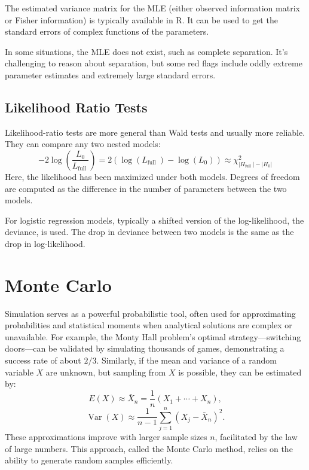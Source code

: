 \documentclass{article}
\begin{document}
The estimated variance matrix for the MLE (either observed information matrix or Fisher information) is typically available in R. It can be used to get the standard errors of complex functions of the parameters.

In some situations, the MLE does not exist, such as complete separation. It's challenging to reason about separation, but some red flags include oddly extreme parameter estimates and extremely large standard errors.

\subsection{Likelihood Ratio Tests}

Likelihood-ratio tests are more general than Wald tests and usually more reliable. They can compare any two nested models:
$$
-2 \log \left(\frac{L_{0}}{L_{\text {full }}}\right)=2\left(\log \left(L_{\text {full }}\right)-\log \left(L_{0}\right)\right) \approx \chi_{\left|H_{\text {full }}\right|-\left|H_{0}\right|}^{2}
$$
Here, the likelihood has been maximized under both models. Degrees of freedom are computed as the difference in the number of parameters between the two models.

For logistic regression models, typically a shifted version of the log-likelihood, the deviance, is used. The drop in deviance between two models is the same as the drop in log-likelihood.

\section{Monte Carlo}

Simulation serves as a powerful probabilistic tool, often used for approximating probabilities and statistical moments when analytical solutions are complex or unavailable. For example, the Monty Hall problem's optimal strategy—switching doors—can be validated by simulating thousands of games, demonstrating a success rate of about $2/3$. Similarly, if the mean and variance of a random variable $X$ are unknown, but sampling from $X$ is possible, they can be estimated by:
\[
E(X) \approx \bar{X}_n = \frac{1}{n}(X_1 + \cdots + X_n),
\]
\[
\operatorname{Var}(X) \approx \frac{1}{n-1} \sum_{j=1}^{n} (X_j - \bar{X}_n)^2.
\]
These approximations improve with larger sample sizes $n$, facilitated by the law of large numbers. This approach, called the Monte Carlo method, relies on the ability to generate random samples efficiently.
\end{document}
